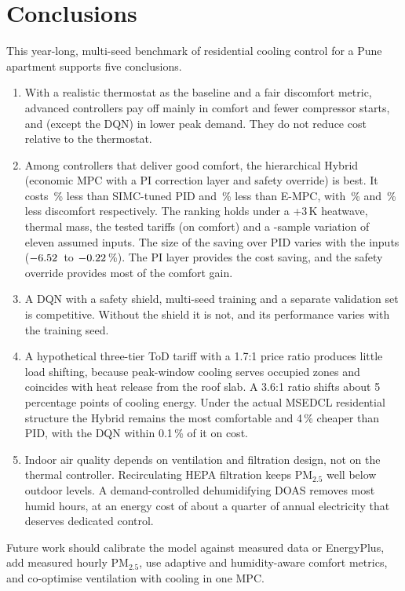\section{Conclusions}\label{sec:conclusion}
This year-long, multi-seed benchmark of residential cooling control for a Pune
apartment supports five conclusions.
\begin{enumerate}
\item With a realistic thermostat as the baseline and a fair discomfort metric,
      advanced controllers pay off mainly in comfort and fewer compressor starts, and
      (except the DQN) in lower peak demand. They do not reduce cost relative to the
      thermostat.
\item Among controllers that deliver good comfort, the hierarchical Hybrid (economic MPC
      with a PI correction layer and safety override) is best. It costs
      \RelHybPidCost\,\% less than SIMC-tuned PID and \RelHybMpcCost\,\% less than
      E-MPC, with \RelHybPidKh\,\% and \RelHybMpcKh\,\% less discomfort respectively.
      The ranking holds under a +3\,K heatwave, thermal mass, the tested tariffs (on comfort) and
      a \UqN-sample variation of eleven assumed inputs. The size of the saving over
      PID varies with the inputs ($-6.52$\ to $-0.22$\,\%). The PI layer
      provides the cost saving, and the safety override provides most of the
      comfort gain.
\item A DQN with a safety shield, multi-seed training and a separate validation set is
      competitive. Without the shield it is not, and its performance varies with the
      training seed.
\item A hypothetical three-tier ToD tariff with a 1.7:1 price ratio produces little load
      shifting, because peak-window cooling serves occupied zones and coincides with
      heat release from the roof slab. A 3.6:1 ratio shifts about 5 percentage points of
      cooling energy. Under the actual MSEDCL residential structure the Hybrid
      remains the most comfortable and 4\,\% cheaper than PID, with the DQN within
      0.1\,\% of it on cost.
\item Indoor air quality depends on ventilation and filtration design, not on the
      thermal controller. Recirculating HEPA filtration keeps PM$_{2.5}$ well below
      outdoor levels. A demand-controlled dehumidifying DOAS removes most humid hours,
      at an energy cost of about a quarter of annual electricity that deserves dedicated
      control.
\end{enumerate}
Future work should calibrate the model against measured data or EnergyPlus, add
measured hourly PM$_{2.5}$, use adaptive and humidity-aware comfort metrics, and
co-optimise ventilation with cooling in one MPC.

